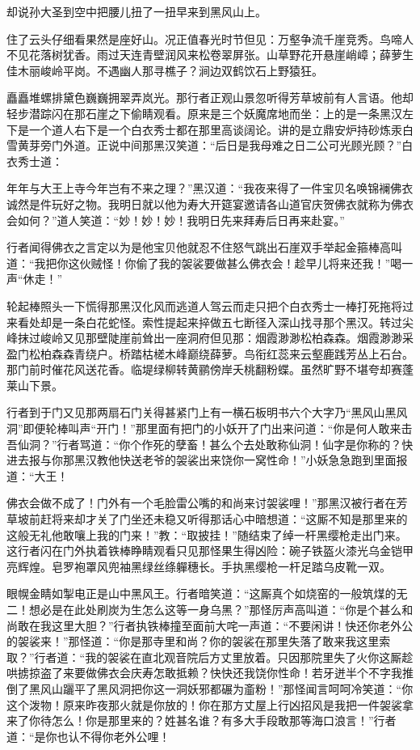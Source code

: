 \documentclass[12pt,UTF8]{ctexbook}
\begin{document}
{却说孙大圣到空中把腰儿扭了一扭早来到黑风山上。

住了云头仔细看果然是座好山。况正值春光时节但见：万壑争流千崖竞秀。鸟啼人不见花落树犹香。雨过天连青壁润风来松卷翠屏张。山草野花开悬崖峭嶂；薛萝生佳木丽峻岭平岗。不遇幽人那寻樵子？涧边双鹤饮石上野猿狂。

矗矗堆螺排黛色巍巍拥翠弄岚光。那行者正观山景忽听得芳草坡前有人言语。他却轻步潜踪闪在那石崖之下偷睛观看。原来是三个妖魔席地而坐：上的是一条黑汉左下是一个道人右下是一个白衣秀士都在那里高谈阔论。讲的是立鼎安炉持砂炼汞白雪黄芽旁门外道。正说中间那黑汉笑道：“后日是我母难之日二公可光顾光顾？”白衣秀士道：

年年与大王上寺今年岂有不来之理？”黑汉道：“我夜来得了一件宝贝名唤锦襕佛衣诚然是件玩好之物。我明日就以他为寿大开筵宴邀请各山道官庆贺佛衣就称为佛衣会如何？”道人笑道：“妙！妙！妙！我明日先来拜寿后日再来赴宴。”

行者闻得佛衣之言定以为是他宝贝他就忍不住怒气跳出石崖双手举起金箍棒高叫道：“我把你这伙贼怪！你偷了我的袈裟要做甚么佛衣会！趁早儿将来还我！”喝一声“休走！”

轮起棒照头一下慌得那黑汉化风而逃道人驾云而走只把个白衣秀士一棒打死拖将过来看处却是一条白花蛇怪。索性提起来捽做五七断径入深山找寻那个黑汉。转过尖峰抹过峻岭又见那壁陡崖前耸出一座洞府但见那：烟霞渺渺松柏森森。烟霞渺渺采盈门松柏森森青绕户。桥踏枯槎木峰巅绕薛萝。鸟衔红蕊来云壑鹿践芳丛上石台。那门前时催花风送花香。临堤绿柳转黄鹂傍岸夭桃翻粉蝶。虽然旷野不堪夸却赛蓬莱山下景。

行者到于门又见那两扇石门关得甚紧门上有一横石板明书六个大字乃“黑风山黑风洞”即便轮棒叫声“开门！”那里面有把门的小妖开了门出来问道：“你是何人敢来击吾仙洞？”行者骂道：“你个作死的孽畜！甚么个去处敢称仙洞！仙字是你称的？快进去报与你那黑汉教他快送老爷的袈裟出来饶你一窝性命！”小妖急急跑到里面报道：“大王！

佛衣会做不成了！门外有一个毛脸雷公嘴的和尚来讨袈裟哩！”那黑汉被行者在芳草坡前赶将来却才关了门坐还未稳又听得那话心中暗想道：“这厮不知是那里来的这般无礼他敢嚷上我的门来！”教：“取披挂！”随结束了绰一杆黑缨枪走出门来。这行者闪在门外执着铁棒睁睛观看只见那怪果生得凶险：碗子铁盔火漆光乌金铠甲亮辉煌。皂罗袍罩风兜袖黑绿丝绦軃穗长。手执黑缨枪一杆足踏乌皮靴一双。

眼幌金睛如掣电正是山中黑风王。行者暗笑道：“这厮真个如烧窑的一般筑煤的无二！想必是在此处刷炭为生怎么这等一身乌黑？”那怪厉声高叫道：“你是个甚么和尚敢在我这里大胆？”行者执铁棒撞至面前大咤一声道：“不要闲讲！快还你老外公的袈裟来！”那怪道：“你是那寺里和尚？你的袈裟在那里失落了敢来我这里索取？”行者道：“我的袈裟在直北观音院后方丈里放着。只因那院里失了火你这厮趁哄掳掠盗了来要做佛衣会庆寿怎敢抵赖？快快还我饶你性命！若牙迸半个不字我推倒了黑风山躧平了黑风洞把你这一洞妖邪都碾为齑粉！”那怪闻言呵呵冷笑道：“你这个泼物！原来昨夜那火就是你放的！你在那方丈屋上行凶招风是我把一件袈裟拿来了你待怎么！你是那里来的？姓甚名谁？有多大手段敢那等海口浪言！”行者道：“是你也认不得你老外公哩！

}
\end{document}
